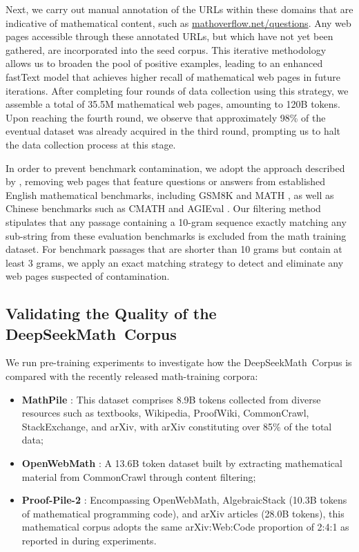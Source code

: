 \begin{itemize}[topsep=0pt]
Next, we carry out manual annotation of the URLs within these domains that are indicative of mathematical content, such as \url{mathoverflow.net/questions}. Any web pages accessible through these annotated URLs, but which have not yet been gathered, are incorporated into the seed corpus. This iterative methodology allows us to broaden the pool of positive examples, leading to an enhanced fastText model that achieves higher recall of mathematical web pages in future iterations. After completing four rounds of data collection using this strategy, we assemble a total of 35.5M mathematical web pages, amounting to 120B tokens. Upon reaching the fourth round, we observe that approximately 98\% of the eventual dataset was already acquired in the third round, prompting us to halt the data collection process at this stage.

In order to prevent benchmark contamination, we adopt the approach described by \cite{deepseek-coder}, removing web pages that feature questions or answers from established English mathematical benchmarks, including GSM8K \citep{gsm8k} and MATH \citep{MATH}, as well as Chinese benchmarks such as CMATH \citep{wei2023cmath} and AGIEval \citep{agieval}. Our filtering method stipulates that any passage containing a 10-gram sequence exactly matching any sub-string from these evaluation benchmarks is excluded from the math training dataset. For benchmark passages that are shorter than 10 grams but contain at least 3 grams, we apply an exact matching strategy to detect and eliminate any web pages suspected of contamination.

\subsection{Validating the Quality of the DeepSeekMath~Corpus}

We run pre-training experiments to investigate how the DeepSeekMath~Corpus is compared with the recently released math-training corpora:

\begin{itemize}[topsep=0pt]
    \item \textbf{MathPile} \citep{mathpile}: This dataset comprises 8.9B tokens collected from diverse resources such as textbooks, Wikipedia, ProofWiki, CommonCrawl, StackExchange, and arXiv, with arXiv constituting over 85\% of the total data;
    \item \textbf{OpenWebMath} \citep{openwebmath}: A 13.6B token dataset built by extracting mathematical material from CommonCrawl through content filtering;
    \item \textbf{Proof-Pile-2} \citep{llemma}: Encompassing OpenWebMath, AlgebraicStack (10.3B tokens of mathematical programming code), and arXiv articles (28.0B tokens), this mathematical corpus adopts the same arXiv:Web:Code proportion of 2:4:1 as reported in \cite{llemma} during experiments.
\end{itemize}


\end{itemize}

